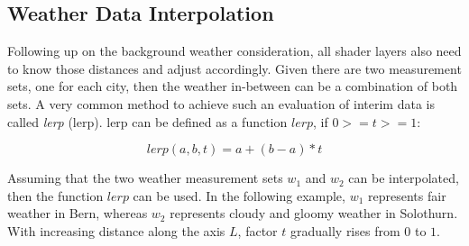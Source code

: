 \pagebreak

\subsection{Weather Data Interpolation}
\label{section:impl:layerinterpolation}
Following up on the background weather consideration, all \gls{shader} layers also need to know those distances and adjust accordingly.
Given there are two measurement sets, one for each city, then the weather in-between can be a combination of both sets.
A very common method to achieve such an evaluation of interim data is called \emph{\gls{lerp}} (lerp).
\Gls{lerp} can be defined as a function $lerp$, if $0 >= t >= 1$: 

$$lerp(a, b, t) = a + (b - a) * t$$

\noindent
Assuming that the two weather measurement sets $w_1$ and $w_2$ can be interpolated, then the function $lerp$ can be used.
In the following example, $w_1$ represents fair weather in Bern, whereas $w_2$ represents cloudy and gloomy weather in Solothurn.
With increasing distance along the axis \color{darkercyan}$L$\color{black}, factor $t$ gradually rises from $0$ to $1$.

\begin{figure}[H]
    \centering
    \label{img:tikz:shadersetup:lerp}       
\end{figure}

